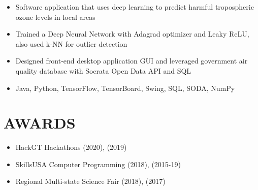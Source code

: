 \documentclass[11pt,letterpaper]{article}
\begin{document}
  \ifdeeplearningfortroposphericozoneprediction
    {\fontsize{12}{12}}

    \begin{itemize}
      \item{Software application that uses deep learning to predict harmful tropospheric ozone levels in local areas}

      \item{Trained a Deep Neural Network with Adagrad optimizer and Leaky ReLU, also used k-NN for outlier detection}

      \item{Designed front-end desktop application GUI and leveraged government air quality database with Socrata Open Data API and SQL}

      \item{
        {}
        Java, Python, TensorFlow, TensorBoard, Swing, SQL, SODA, NumPy
      }
    \end{itemize}
  \fi

  \smallskip


  \section*{AWARDS}

  \begin{itemize}
    \item{
      HackGT Hackathons \textemdash{}
      {}
      (2020),
      {}
      (2019)
    }



    \item{
      SkillsUSA Computer Programming
      \textemdash{}
      {}
      (2018),
      {}
      (2015-19)
    }

    \item{
      Regional Multi-state Science Fair
      \textemdash{}
      {}
      (2018),
      {}
      (2017)
    }
  \end{itemize}
\end{document}
